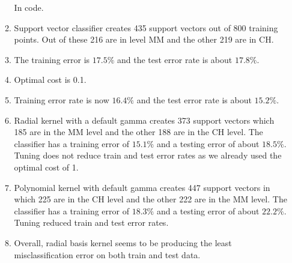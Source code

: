 \documentclass{article}
\begin{document}
\begin{enumerate}
\begin{enumerate}
        In code.
        
        \item
        
        Support vector classifier creates 435 support vectors out of 800 training points. Out of these 216 are in level MM and the other 219 are in CH.
        
        \item
        
        The training error is $17.5\%$ and the test error rate is about $17.8\%$.
        
        \item
        
        Optimal cost is 0.1.
        
        \item
        
        Training error rate is now $16.4\%$ and the test error rate is about $15.2\%.$
        
        \item
        
        Radial kernel with a default gamma creates 373 support vectors which 185 are in the MM level and the other 188 are in the CH level. The classifier has a training error of $15.1\%$ and a testing error of about $18.5\%$. Tuning does not reduce train and test error rates as we already used the optimal cost of 1.
        
        \item
        
        Polynomial kernel with default gamma creates 447 support vectors in which 225 are in the CH level and the other 222 are in the MM level. The classifier has a training error of $18.3\%$ and a testing error of about $22.2\%$. Tuning reduced train and test error rates.
        
        \item
        
        Overall, radial basis kernel seems to be producing the least misclassification error on both train and test data.
        
    \end{enumerate}
    
\end{enumerate}
\end{document}
